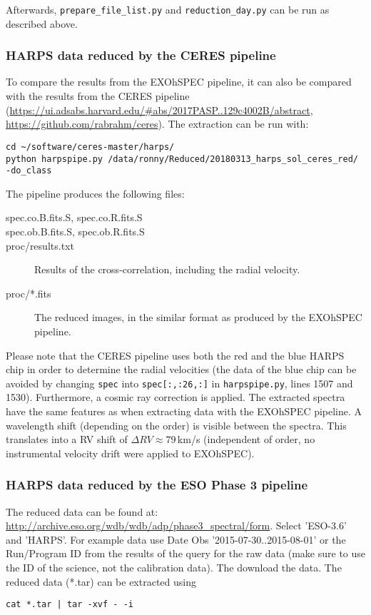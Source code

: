 \documentclass[10pt,a4paper]{article}
\begin{document}
\noindent Afterwards, \verb|prepare_file_list.py| and \verb|reduction_day.py| can be run as described above.

\subsubsection{HARPS data reduced by the CERES pipeline}
To compare the results from the EXOhSPEC pipeline, it can also be compared with the results from the CERES pipeline (\url{https://ui.adsabs.harvard.edu/#abs/2017PASP..129c4002B/abstract}, \url{https://github.com/rabrahm/ceres}). The extraction can be run with:
\begin{lstlisting}[style=base]
cd ~/software/ceres-master/harps/
python harpspipe.py /data/ronny/Reduced/20180313_harps_sol_ceres_red/ -do_class
\end{lstlisting}

The pipeline produces the following files:
\begin{description}
  \item[spec.co.B.fits.S, spec.co.R.fits.S] 
  \item[spec.ob.B.fits.S, spec.ob.R.fits.S] 
  \item[proc/results.txt] Results of the cross-correlation, including the radial velocity.
  \item[proc/*.fits] The reduced images, in the similar format as produced by the EXOhSPEC pipeline.
\end{description}

Please note that the CERES pipeline uses both the red and the blue HARPS chip in order to determine the radial velocities (the data of the blue chip can be avoided by changing \verb|spec| into \verb|spec[:,:26,:]| in \verb|harpspipe.py|, lines 1507 and 1530). Furthermore, a cosmic ray correction is applied. The extracted spectra have the same features as when extracting data with the EXOhSPEC pipeline. A wavelength shift (depending on the order) is visible between the spectra. This translates into a RV shift of $\Delta RV \approx 79$\,km/s (independent of order, no instrumental velocity drift were applied to EXOhSPEC).



\subsubsection{HARPS data reduced by the ESO Phase 3 pipeline}
The reduced data can be found at: \url{http://archive.eso.org/wdb/wdb/adp/phase3_spectral/form}. Select 'ESO-3.6' and 'HARPS'. For example data use Date Obs '2015-07-30..2015-08-01' or the Run/Program ID from the results of the query for the raw data (make sure to use the ID of the science, not the calibration data). The download the data. The reduced data (*.tar) can be extracted using
\begin{lstlisting}[style=base]
cat *.tar | tar -xvf - -i
\end{lstlisting}
\end{document}
